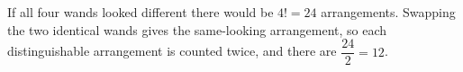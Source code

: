 If all four wands looked different there would be $4!=24$ arrangements. Swapping the two identical wands gives the same-looking arrangement, so each distinguishable arrangement is counted twice, and there are $\dfrac{24}{2}=\boxed{12}$.
